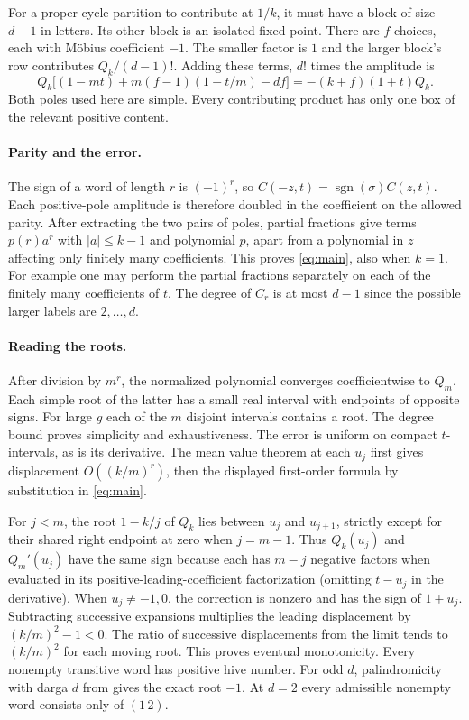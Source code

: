 \documentclass[11pt]{article}
\begin{document}
For a proper cycle partition to contribute at $1/k$, it must have a block of size $d-1$ in letters. Its other block is an isolated fixed point. There are $f$ choices, each with M\"obius coefficient $-1$. The smaller factor is $1$ and the larger block's row contributes $Q_k/(d-1)!$. Adding these terms, $d!$ times the amplitude is
\[
 Q_k\big[(1-mt)+m(f-1)(1-t/m)-df\big]
 =-(k+f)(1+t)Q_k .
\]
Both poles used here are simple. Every contributing product has only one box of the relevant positive content.

\paragraph{Parity and the error.}
The sign of a word of length $r$ is $(-1)^r$, so $C(-z,t)=\operatorname{sgn}(\sigma)C(z,t)$. Each positive-pole amplitude is therefore doubled in the coefficient on the allowed parity. After extracting the two pairs of poles, partial fractions give terms $p(r)a^r$ with $|a|\le k-1$ and polynomial $p$, apart from a polynomial in $z$ affecting only finitely many coefficients. This proves \eqref{eq:main}, also when $k=1$. For example one may perform the partial fractions separately on each of the finitely many coefficients of $t$. The degree of $C_r$ is at most $d-1$ since the possible larger labels are $2,\dots,d$.

\paragraph{Reading the roots.}
After division by $m^r$, the normalized polynomial converges coefficientwise to $Q_m$. Each simple root of the latter has a small real interval with endpoints of opposite signs. For large $g$ each of the $m$ disjoint intervals contains a root. The degree bound proves simplicity and exhaustiveness. The error is uniform on compact $t$-intervals, as is its derivative. The mean value theorem at each $u_j$ first gives displacement $O((k/m)^r)$, then the displayed first-order formula by substitution in \eqref{eq:main}.

For $j<m$, the root $1-k/j$ of $Q_k$ lies between $u_j$ and $u_{j+1}$, strictly except for their shared right endpoint at zero when $j=m-1$. Thus $Q_k(u_j)$ and $Q_m'(u_j)$ have the same sign because each has $m-j$ negative factors when evaluated in its positive-leading-coefficient factorization (omitting $t-u_j$ in the derivative). When $u_j\ne-1,0$, the correction is nonzero and has the sign of $1+u_j$. Subtracting successive expansions multiplies the leading displacement by $(k/m)^2-1<0$. The ratio of successive displacements from the limit tends to $(k/m)^2$ for each moving root. This proves eventual monotonicity. Every nonempty transitive word has positive hive number. For odd $d$, palindromicity with darga $d$ from \cite[Prop.~3.9]{cdm} gives the exact root $-1$. At $d=2$ every admissible nonempty word consists only of $(1\,2)$.
\end{document}
